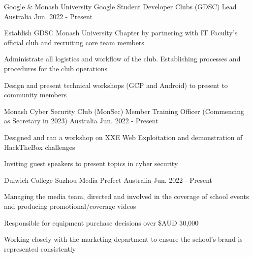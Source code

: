 

\begin{cventries}

    \cventry
    {Google \& Monash University} %
    {Google Student Developer Clubs (GDSC) Lead} %
    {Australia} %
    {Jun. 2022 - Present} %
    {
        \begin{cvitems} %
            \item {Establish GDSC Monash University Chapter by partnering with IT Faculty's official club and recruiting core team members}
            \item {Administrate all logistics and workflow of the club. Establishing processes and procedures for the club operations}
            \item {Design and present technical workshops (GCP and Android) to present to community members}
        \end{cvitems}
    }

    \cventry
    {Monash Cyber Security Club (MonSec)} %
    {Member Training Officer (Commencing as Secretary in 2023)} %
    {Australia} %
    {Jun. 2022 - Present} %
    {
        \begin{cvitems} %
            \item {Designed and ran a workshop on XXE Web Exploitation and demonstration of HackTheBox challenges}
            \item {Inviting guest speakers to present topics in cyber security}
        \end{cvitems}
    }


    \cventry
    {Dulwich College Suzhou} %
    {Media Prefect} %
    {Australia} %
    {Jun. 2022 - Present} %
    {
        \begin{cvitems} %
            \item {Managing the media team, directed and involved in the coverage of school events and producing promotional/coverage videos}
            \item {Responsible for equipment purchase decisions over \$AUD 30,000}
            \item {Working closely with the marketing department to ensure the school's brand is represented consistently}
        \end{cvitems}
    }



\end{cventries}
